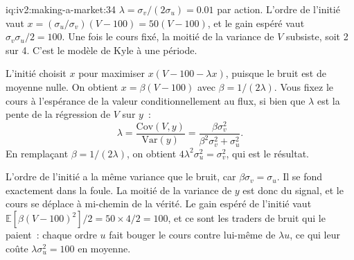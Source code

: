\begin{solution}{iq:iv2:making-a-market:34}
$\lambda = \sigma_v/(2\sigma_u) = 0.01$ par action. L'ordre de l'initié vaut $x = (\sigma_u/\sigma_v)(V - 100) = 50(V - 100)$, et le gain espéré vaut $\sigma_v\sigma_u/2 = 100$. Une fois le cours fixé, la moitié de la variance de $V$ subsiste, soit 2 sur 4. C'est le modèle de Kyle à une période.

L'initié choisit $x$ pour maximiser $x(V - 100 - \lambda x)$, puisque le bruit est de moyenne nulle. On obtient $x = \beta(V - 100)$ avec $\beta = 1/(2\lambda)$. Vous fixez le cours à l'espérance de la valeur conditionnellement au flux, si bien que $\lambda$ est la pente de la régression de $V$ sur $y$~:
\[
\lambda = \frac{\mathrm{Cov}(V, y)}{\mathrm{Var}(y)} = \frac{\beta \sigma_v^2}{\beta^2 \sigma_v^2 + \sigma_u^2}.
\]
En remplaçant $\beta = 1/(2\lambda)$, on obtient $4\lambda^2\sigma_u^2 = \sigma_v^2$, qui est le résultat.

L'ordre de l'initié a la même variance que le bruit, car $\beta\sigma_v = \sigma_u$. Il se fond exactement dans la foule. La moitié de la variance de $y$ est donc du signal, et le cours se déplace à mi-chemin de la vérité. Le gain espéré de l'initié vaut $\mathbb{E}\left[\beta (V-100)^2\right]/2 = 50 \times 4/2 = 100$, et ce sont les traders de bruit qui le paient~: chaque ordre $u$ fait bouger le cours contre lui-même de $\lambda u$, ce qui leur coûte $\lambda\sigma_u^2 = 100$ en moyenne.

\end{solution}

